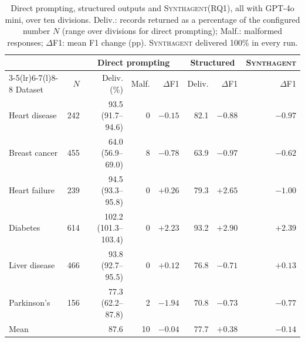 \documentclass[conference]{IEEEtran}
\newcommand{\system}{\textsc{Synthagent}\xspace}
\begin{document}
\begin{table}[t]
\centering
\caption{Direct prompting, structured outputs and \system (RQ1), all with GPT-4o mini, over ten divisions. Deliv.: records returned as a percentage of the configured number $N$ (range over divisions for direct prompting); Malf.: malformed responses; $\Delta$F1: mean F1 change (pp). \system delivered 100\% in every run.}
\label{tab:raw}
\scriptsize
\setlength{\tabcolsep}{1.5pt}
\begin{tabular*}{\columnwidth}{@{\extracolsep{\fill}}lrrrrrrr@{}}
\toprule
& & \multicolumn{3}{c}{Direct prompting} & \multicolumn{2}{c}{Structured} & \system \\
\cmidrule(lr){3-5}\cmidrule(lr){6-7}\cmidrule(l){8-8}
Dataset & $N$ & Deliv. (\%) & Malf. & $\Delta$F1 & Deliv. & $\Delta$F1 & $\Delta$F1 \\
\midrule
Heart disease & 242 & 93.5 (91.7--94.6) & 0 & $-0.15$ & 82.1 & $-0.88$ & $-0.97$ \\
Breast cancer & 455 & 64.0 (56.9--69.0) & 8 & $-0.78$ & 63.9 & $-0.97$ & $-0.62$ \\
Heart failure & 239 & 94.5 (93.3--95.8) & 0 & $+0.26$ & 79.3 & $+2.65$ & $-1.00$ \\
Diabetes & 614 & 102.2 (101.3--103.4) & 0 & $+2.23$ & 93.2 & $+2.90$ & $+2.39$ \\
Liver disease & 466 & 93.8 (92.7--95.5) & 0 & $+0.12$ & 76.8 & $-0.71$ & $+0.13$ \\
Parkinson's & 156 & 77.3 (62.2--87.8) & 2 & $-1.94$ & 70.8 & $-0.73$ & $-0.77$ \\
\midrule
Mean & & 87.6 & 10 & $-0.04$ & 77.7 & $+0.38$ & $-0.14$ \\
\bottomrule
\end{tabular*}
\end{table}
\end{document}
